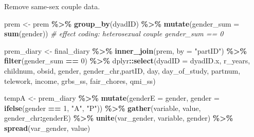 \documentclass[
]{article}
\newenvironment{Shaded}{\begin{snugshade}}{\end{snugshade}}
\newcommand{\CommentTok}[1]{\textcolor[rgb]{0.56,0.35,0.01}{\textit{#1}}}
\newcommand{\DataTypeTok}[1]{\textcolor[rgb]{0.13,0.29,0.53}{#1}}
\newcommand{\DecValTok}[1]{\textcolor[rgb]{0.00,0.00,0.81}{#1}}
\newcommand{\KeywordTok}[1]{\textcolor[rgb]{0.13,0.29,0.53}{\textbf{#1}}}
\newcommand{\NormalTok}[1]{#1}
\newcommand{\OperatorTok}[1]{\textcolor[rgb]{0.81,0.36,0.00}{\textbf{#1}}}
\newcommand{\StringTok}[1]{\textcolor[rgb]{0.31,0.60,0.02}{#1}}
\begin{document}
Remove same-sex couple data.

\begin{Shaded}
\begin{Highlighting}[]
\NormalTok{prem \textless{}{-}}\StringTok{ }\NormalTok{prem }\OperatorTok{\%\textgreater{}\%}
\StringTok{  }\KeywordTok{group\_by}\NormalTok{(dyadID) }\OperatorTok{\%\textgreater{}\%}
\StringTok{  }\KeywordTok{mutate}\NormalTok{(}\DataTypeTok{gender\_sum =} \KeywordTok{sum}\NormalTok{(gender)) }\CommentTok{\# effect coding: heterosexual couple gender\_sum == 0}
\end{Highlighting}
\end{Shaded}

\begin{Shaded}
\begin{Highlighting}[]
\NormalTok{prem\_diary \textless{}{-}}\StringTok{ }\NormalTok{final\_diary }\OperatorTok{\%\textgreater{}\%}
\StringTok{  }\KeywordTok{inner\_join}\NormalTok{(prem, }\DataTypeTok{by =} \StringTok{"partID"}\NormalTok{) }\OperatorTok{\%\textgreater{}\%}
\StringTok{  }\KeywordTok{filter}\NormalTok{(gender\_sum }\OperatorTok{==}\StringTok{ }\DecValTok{0}\NormalTok{) }\OperatorTok{\%\textgreater{}\%}
\StringTok{  }\NormalTok{dplyr}\OperatorTok{::}\KeywordTok{select}\NormalTok{(}\DataTypeTok{dyadID =}\NormalTok{ dyadID.x, r\_years, childnum, obsid, gender, gender\_chr,partID, day, day\_of\_study, partnum,  telework, income, grbs\_ss, fair\_chores, qmi\_ss)}
\end{Highlighting}
\end{Shaded}

\begin{Shaded}
\begin{Highlighting}[]
\NormalTok{tempA \textless{}{-}}\StringTok{ }\NormalTok{prem\_diary }\OperatorTok{\%\textgreater{}\%}\StringTok{  }
\StringTok{  }\KeywordTok{mutate}\NormalTok{(}\DataTypeTok{genderE =}\NormalTok{ gender,}
         \DataTypeTok{gender =} \KeywordTok{ifelse}\NormalTok{(gender }\OperatorTok{==}\StringTok{ }\DecValTok{1}\NormalTok{, }\StringTok{"A"}\NormalTok{, }\StringTok{"P"}\NormalTok{)) }\OperatorTok{\%\textgreater{}\%}
\StringTok{  }\KeywordTok{gather}\NormalTok{(variable, value, gender\_chr}\OperatorTok{:}\NormalTok{genderE) }\OperatorTok{\%\textgreater{}\%}\StringTok{ }
\StringTok{  }\KeywordTok{unite}\NormalTok{(var\_gender, variable, gender) }\OperatorTok{\%\textgreater{}\%}\StringTok{ }
\StringTok{  }\KeywordTok{spread}\NormalTok{(var\_gender, value)}
\end{Highlighting}
\end{Shaded}
\end{document}

